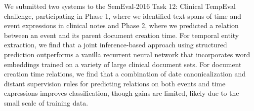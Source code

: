 We submitted two systems to the SemEval-2016 Task 12: Clinical TempEval challenge, participating in Phase 1, where we identified text spans of time and event expressions in clinical notes and Phase 2, where we predicted a relation between an event and its parent document creation time. For temporal entity extraction, we find that a joint inference-based approach using structured prediction outperforms a vanilla recurrent neural network that incorporates word embeddings trained on a variety of large clinical document sets. For document creation time relations, we find that a combination of date canonicalization and distant supervision rules for predicting relations on both events and time expressions improves classification, though gains are limited, likely due to the small scale of training data.

